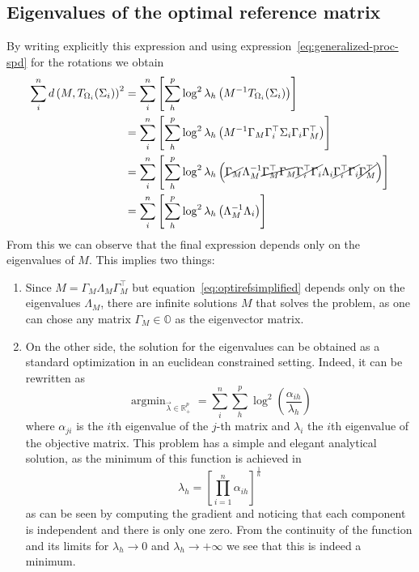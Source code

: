 \documentclass[fleqn]{article}
\theoremstyle{theorem}
\theoremstyle{definition}
\DeclareMathOperator*{\argmin}{argmin}
\begin{document}
    \subsection{Eigenvalues of the optimal reference matrix}
    By writing explicitly this expression and using expression~\eqref{eq:generalized-proc-spd} for the rotations we obtain
    \begin{align}
        \sum_i^n d \left(M, T_{\Omega_i}(\Sigma_i)\right)^2 &= \sum_i^n\left[\sum_h^p\log^2\lambda_h\left(M^{-1}T_{\Omega_i}(\Sigma_i)\right)\right] \nonumber\\
        &= \sum_i^n\left[\sum_h^p\log^2\lambda_h\left(M^{-1}\Gamma_M\Gamma_i^\top\Sigma_i\Gamma_i\Gamma_M^\top\right)\right] \nonumber\\
        &=  \sum_i^n \left[\sum_h^p \log^2\lambda_h \left(\cancel{\Gamma_M}\Lambda_M^{-1}\cancel{\Gamma_M^\top\Gamma_M}\cancel{\Gamma_i^\top\Gamma_i}\Lambda_i\cancel{\Gamma_i^\top\Gamma_i}\cancel{\Gamma_M^\top}\right)\right] \nonumber\\
        &= \sum_i^n\left[\sum_h^p\log^2\lambda_h\left(\Lambda_M^{-1}\Lambda_i\right)\right]\label{eq:optirefsimplified}
    \end{align}
    From this we can observe that the final expression depends only on the eigenvalues of $M$. This implies two things:
    \begin{enumerate}
        \item Since $M = \Gamma_M\Lambda_M\Gamma_M^\top$ but equation~\eqref{eq:optirefsimplified} depends only on the eigenvalues $\Lambda_M$, there are infinite solutions $M$ that solves the problem, as one can chose any matrix $\Gamma_M\in\mathbb{O}$ as the eigenvector matrix.
        \item On the other side, the solution for the eigenvalues can be obtained as a standard optimization in an euclidean constrained setting. Indeed, it can be rewritten as
        \begin{equation*}
            \argmin_{\vec{\lambda}\in\mathbb{R}^p_+} = \sum_i^n\sum_h^p\log^2\left(\frac{\alpha_{ih}}{\lambda_h}\right)
        \end{equation*}
        where $\alpha_{ji}$ is the $i$th eigenvalue of the $j$-th matrix and $\lambda_i$ the $i$th eigenvalue of the objective matrix.
        This problem has a simple and elegant analytical solution, as the minimum of this function is achieved in
        \begin{equation}\label{eq:optiref-sol-eigval}
            \lambda_h =\left[\prod_{i=1}^n\alpha_{ih}\right]^{\frac{1}{n}}
        \end{equation}
        as can be seen by computing the gradient and noticing that each component is independent and there is only one zero. From the continuity of the function and its limits for $\lambda_h\to0$ and $\lambda_h\to+\infty$ we see that this is indeed a minimum.
    \end{enumerate}
\end{document}
